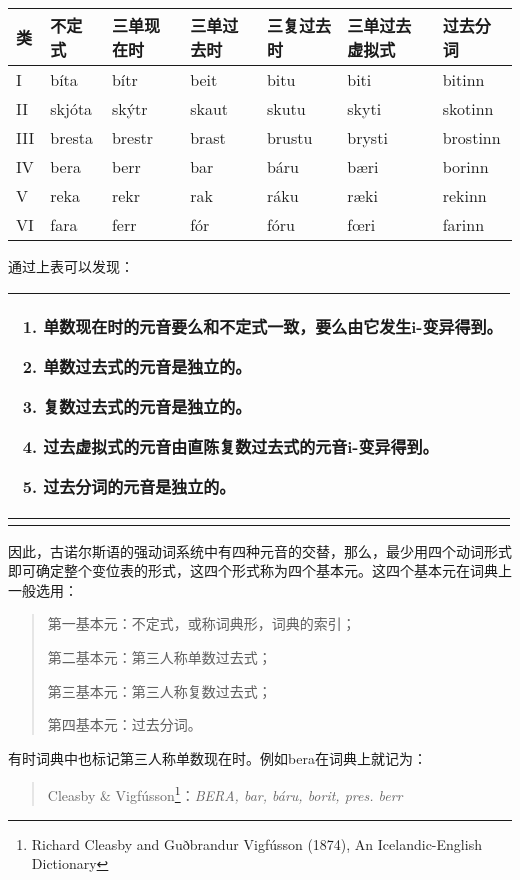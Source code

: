 \begin{longtable}{lllllll}
\toprule
类 & 不定式 & 三单现在时 & 三单过去时 & 三复过去时 & 三单过去虚拟式 & 过去分词 \\
\midrule
\endhead
\bottomrule
\endfoot
I & bíta & bítr & beit & bitu & biti & bitinn \\
II & skjóta & skýtr & skaut & skutu & skyti & skotinn \\
III & bresta & brestr & brast & brustu & brysti & brostinn \\
IV & bera & berr & bar & báru & bæri & borinn \\
V & reka & rekr & rak & ráku & ræki & rekinn \\
VI & fara & ferr & fór & fóru & fœri & farinn \\
\end{longtable}

通过上表可以发现：

\begin{longtable}{l}
\toprule
\begin{enumerate}\def\labelenumi{\arabic{enumi})}\item  单数现在时的元音要么和不定式一致，要么由它发生i-变异得到。\item  单数过去式的元音是独立的。\item  复数过去式的元音是独立的。\item  过去虚拟式的元音由直陈复数过去式的元音i-变异得到。\item  过去分词的元音是独立的。\end{enumerate} \\
\midrule
\endhead
\bottomrule
\endfoot
\end{longtable}

因此，古诺尔斯语的强动词系统中有四种元音的交替，那么，最少用四个动词形式即可确定整个变位表的形式，这四个形式称为四个基本元。这四个基本元在词典上一般选用：

\begin{quote}
第一基本元：不定式，或称词典形，词典的索引；

第二基本元：第三人称单数过去式；

第三基本元：第三人称复数过去式；

第四基本元：过去分词。
\end{quote}

有时词典中也标记第三人称单数现在时。例如bera在词典上就记为：

\begin{quote}
Cleasby \& Vigfússon\footnote{Richard Cleasby and Guðbrandur Vigfússon
  (1874), An Icelandic-English Dictionary}：\emph{BERA, bar, báru,
borit, pres. berr}
\end{quote}

